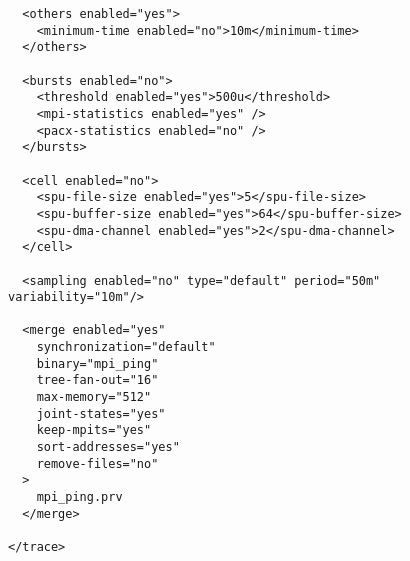 \begin{verbatim}
  <others enabled="yes">
    <minimum-time enabled="no">10m</minimum-time>
  </others>

  <bursts enabled="no">
    <threshold enabled="yes">500u</threshold>
    <mpi-statistics enabled="yes" />
    <pacx-statistics enabled="no" />
  </bursts>

  <cell enabled="no">
    <spu-file-size enabled="yes">5</spu-file-size>
    <spu-buffer-size enabled="yes">64</spu-buffer-size>
    <spu-dma-channel enabled="yes">2</spu-dma-channel>
  </cell>

  <sampling enabled="no" type="default" period="50m" variability="10m"/>

  <merge enabled="yes" 
    synchronization="default"
    binary="mpi_ping"
    tree-fan-out="16"
    max-memory="512"
    joint-states="yes"
    keep-mpits="yes"
    sort-addresses="yes"
    remove-files="no"
  >
    mpi_ping.prv 
  </merge>

</trace>
\end{verbatim}
